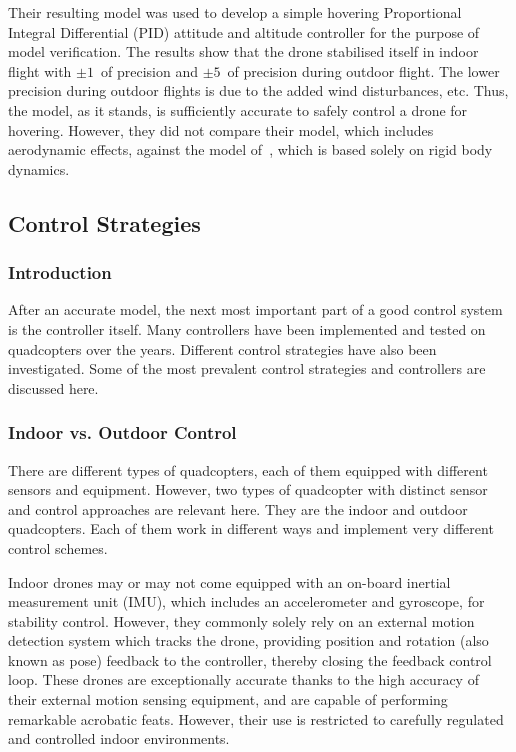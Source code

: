 Their resulting model was used to develop a simple hovering Proportional Integral Differential (PID) attitude and altitude controller for the purpose of model verification. The results show that the drone stabilised itself in indoor flight with $\pm1$\textdegree\ of precision and $\pm5$\textdegree\ of precision during outdoor flight. The lower precision during outdoor flights is due to the added wind disturbances, etc. Thus, the model, as it stands, is sufficiently accurate to safely control a drone for hovering. However, they did not compare their model, which includes aerodynamic effects, against the model of~\citeauthor{hamel2002dynamic}, which is based solely on rigid body dynamics. 

\subsection{Control Strategies}

\subsubsection{Introduction}

After an accurate model, the next most important part of a good control system is the controller itself. Many controllers have been implemented and tested on quadcopters over the years. Different control strategies have also been investigated. Some of the most prevalent control strategies and controllers are discussed here.

\subsubsection{Indoor vs. Outdoor Control}

There are different types of quadcopters, each of them equipped with different sensors and equipment. However, two types of quadcopter with distinct sensor and control approaches are relevant here. They are the indoor and outdoor quadcopters. Each of them work in different ways and implement very different control schemes. 

Indoor drones may or may not come equipped with an on-board inertial measurement unit (IMU), which includes an accelerometer and gyroscope, for stability control. However, they commonly solely rely on an external motion detection system which tracks the drone, providing position and rotation (also known as pose) feedback to the controller, thereby closing the feedback control loop. These drones are exceptionally accurate thanks to the high accuracy of their external motion sensing equipment, and are capable of performing remarkable acrobatic feats. However, their use is restricted to carefully regulated and controlled indoor environments.

